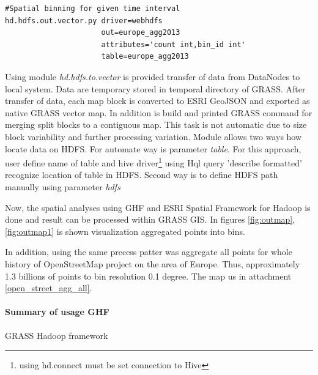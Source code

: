 \documentclass[a4paper,12pt,oneside]{report}
\begin{document}
\begin{footnotesize}
	\begin{lstlisting}[style=python]
#Spatial binning for given time interval
hd.hdfs.out.vector.py driver=webhdfs
                      out=europe_agg2013 
                      attributes='count int,bin_id int' 
                      table=europe_agg2013
	\end{lstlisting}
\end{footnotesize}
	Using module \textit{hd.hdfs.to.vector} is provided transfer of data from DataNodes to local system. Data are temporary stored in temporal directory of GRASS. After transfer of data, each 
	map block is converted to ESRI GeoJSON and exported as native GRASS vector map. In addition is build and printed GRASS command for merging split blocks to a contiguous map. This task is not automatic due to size block variability  and further processing variation. Module allows two
	 ways how locate data on HDFS. For automate way is parameter \textit{table}. For this approach, user
	 define name of table and hive driver\footnote{using hd.connect must be set connection to Hive} using Hql query 'describe formatted' recognize location of table in HDFS.
	 Second way is to define HDFS path manually using parameter \textit{hdfs}
	
	Now, the spatial analyses using GHF and ESRI Spatial Framework for Hadoop is done and result can be processed within GRASS GIS. In figures \ref{fig:outmap}, \ref{fig:outmap1} is shown visualization aggregated points into bins.
	
	 In addition, using the same precess patter was aggregate all points for whole history of OpenStreetMap project on the area of Europe. Thus, approximately 1.3 billions  of points  to bin  resolution 0.1 degree. The map us in attachment \ref{open_street_agg_all}. 
	
	
	
	\paragraph{Summary of usage GHF}
	GRASS Hadoop framework
		
		
		
\end{document}
